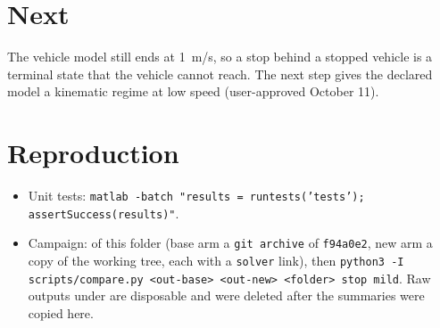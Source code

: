 \documentclass[11pt]{article}
\begin{document}
\section{Next}
The vehicle model still ends at 1~m/s, so a stop behind a stopped vehicle
is a terminal state that the vehicle cannot reach. The next step gives the
declared model a kinematic regime at low speed (user-approved October 11).

\section{Reproduction}
\begin{itemize}
\item Unit tests: \texttt{matlab -batch "results = runtests('tests'); assertSuccess(results)"}.
\item Campaign:  of this folder (base arm a
  \texttt{git archive} of \texttt{f94a0e2}, new arm a copy of the working tree,
  each with a \texttt{solver} link), then
  \texttt{python3 -I scripts/compare.py <out-base> <out-new> <folder> stop mild}.
  Raw outputs under 
  are disposable and were deleted after the summaries were copied here.
\end{itemize}
\end{document}
